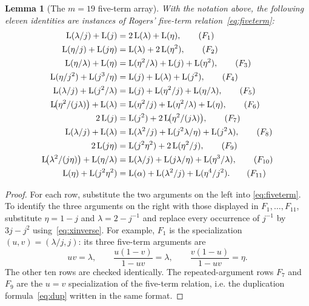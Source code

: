 \documentclass[preprint,12pt,number]{elsarticle}
\newtheorem{lemma}[theorem]{Lemma}
\theoremstyle{remark}
\newcommand{\Lr}{\operatorname{L}}
\begin{document}
\begin{lemma}[The $m=19$ five-term array]\label{lem:m19array}
With the notation above, the following eleven identities are instances of
Rogers' five-term relation~\eqref{eq:fiveterm}:
\begin{align}
\Lr(\lambda/j)+\Lr(j)
 &=2\Lr(\lambda)+\Lr(\eta),\tag{$F_1$}\label{eq:F1}\\
\Lr(\eta/j)+\Lr(j\eta)
 &=\Lr(\lambda)+2\Lr(\eta^2),\tag{$F_2$}\label{eq:F2}\\
\Lr(\eta/\lambda)+\Lr(\eta)
 &=\Lr(\eta^2/\lambda)+\Lr(j)+\Lr(\eta^2),\tag{$F_3$}\label{eq:F3}\\
\Lr(\eta/j^2)+\Lr(j^3/\eta)
 &=\Lr(j)+\Lr(\lambda)+\Lr(j^2),\tag{$F_4$}\label{eq:F4}\\
\Lr(\lambda/j)+\Lr(j^2/\lambda)
 &=\Lr(j)+\Lr(\eta^2/j)+\Lr(\eta/\lambda),\tag{$F_5$}\label{eq:F5}\\
\Lr\!\bigl(\eta^2/(j\lambda)\bigr)+\Lr(\lambda)
 &=\Lr(\eta^2/j)+\Lr(\eta^2/\lambda)+\Lr(\eta),\tag{$F_6$}\label{eq:F6}\\
2\Lr(j)
 &=\Lr(j^2)+2\Lr\!\bigl(\eta^2/(j\lambda)\bigr),\tag{$F_7$}\label{eq:F7}\\
\Lr(\lambda/j)+\Lr(\lambda)
 &=\Lr(\lambda^2/j)+\Lr(j^2\lambda/\eta)+\Lr(j^2\lambda),\tag{$F_8$}\label{eq:F8}\\
2\Lr(j\eta)
 &=\Lr(j^2\eta^2)+2\Lr(\eta^2/j),\tag{$F_9$}\label{eq:F9}\\
\Lr\!\bigl(\lambda^2/(j\eta)\bigr)+\Lr(\eta/\lambda)
 &=\Lr(\lambda/j)+\Lr(j\lambda/\eta)+\Lr(\eta^3/\lambda),\tag{$F_{10}$}\label{eq:F10}\\
\Lr(\eta)+\Lr(j^2\eta^2)
 &=\Lr(\alpha)+\Lr(\lambda^2/j)+\Lr(\eta^4/j^2).\tag{$F_{11}$}\label{eq:F11}
\end{align}
\end{lemma}

\begin{proof}
For each row, substitute the two arguments on the left into
\eqref{eq:fiveterm}.  To identify the three arguments on the right with
those displayed in $F_1,\ldots,F_{11}$, substitute $\eta=1-j$ and
$\lambda=2-j^{-1}$ and replace every occurrence of $j^{-1}$ by
$3j-j^2$ using~\eqref{eq:xinverse}.  For example, $F_1$ is the
specialization $(u,v)=(\lambda/j,j)$: its three five-term arguments are
\[
uv=\lambda,
\qquad
\frac{u(1-v)}{1-uv}=\lambda,
\qquad
\frac{v(1-u)}{1-uv}=\eta.
\]
The other ten rows are checked identically.  The repeated-argument rows
$F_7$ and $F_9$ are the $u=v$ specialization of the five-term relation,
i.e. the duplication formula~\eqref{eq:dup} written in the same format.
\end{proof}
\end{document}
